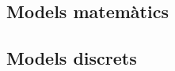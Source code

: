 \documentclass[12pt]{article}
\begin{document}
\begin{ExerciseList}
    \section{Models matemàtics}
    \subsection{Models discrets}
    
% 
% 
% 
% 
% 
% 
% 
% 
% 
% 
% 
% 
% 
% 
%  
% 
% 
% 
% 
% 
% 
% 

\end{ExerciseList}
\end{document}
